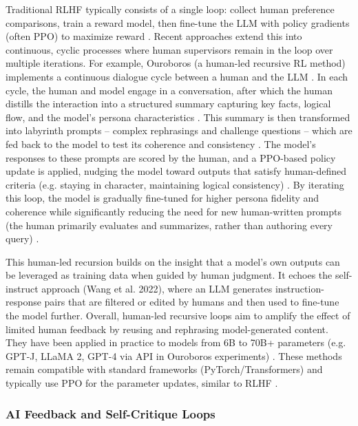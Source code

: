 \documentclass{article}
\begin{document}
Traditional RLHF typically consists of a single loop: collect human preference comparisons, train a reward model, then fine-tune the LLM with policy gradients (often PPO) to maximize reward  . Recent approaches extend this into continuous, cyclic processes where human supervisors remain in the loop over multiple iterations. For example, Ouroboros (a human-led recursive RL method) implements a continuous dialogue cycle between a human and the LLM . In each cycle, the human and model engage in a conversation, after which the human distills the interaction into a structured summary capturing key facts, logical flow, and the model’s persona characteristics . This summary is then transformed into labyrinth prompts – complex rephrasings and challenge questions – which are fed back to the model to test its coherence and consistency . The model’s responses to these prompts are scored by the human, and a PPO-based policy update is applied, nudging the model toward outputs that satisfy human-defined criteria (e.g. staying in character, maintaining logical consistency) . By iterating this loop, the model is gradually fine-tuned for higher persona fidelity and coherence while significantly reducing the need for new human-written prompts (the human primarily evaluates and summarizes, rather than authoring every query) .

This human-led recursion builds on the insight that a model’s own outputs can be leveraged as training data when guided by human judgment. It echoes the self-instruct approach (Wang et al. 2022), where an LLM generates instruction-response pairs that are filtered or edited by humans and then used to fine-tune the model further. Overall, human-led recursive loops aim to amplify the effect of limited human feedback by reusing and rephrasing model-generated content. They have been applied in practice to models from 6B to 70B+ parameters (e.g. GPT-J, LLaMA 2, GPT-4 via API in Ouroboros experiments) . These methods remain compatible with standard frameworks (PyTorch/Transformers) and typically use PPO for the parameter updates, similar to RLHF .

\subsubsection{AI Feedback and Self-Critique Loops}
\end{document}
